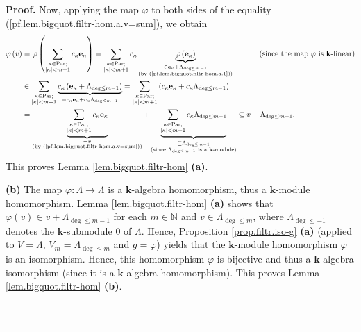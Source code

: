 \documentclass[numbers=enddot,12pt,final,onecolumn,notitlepage]{scrartcl}%
\theoremstyle{definition}
\newenvironment{proof}[1][Proof]{\noindent\textbf{#1.} }{\ \rule{0.5em}{0.5em}}
\let\sumnonlimits\sum
\renewcommand{\sum}{\sumnonlimits\limits}
\begin{document}
\begin{proof}
Now, applying the map $\varphi$ to both sides of the equality
(\ref{pf.lem.bigquot.filtr-hom.a.v=sum}), we obtain%
\begin{align*}
\varphi\left(  v\right)   &  =\varphi\left(  \sum_{\substack{\kappa
\in\operatorname*{Par};\\\left\vert \kappa\right\vert <m+1}}c_{\kappa
}\mathbf{e}_{\kappa}\right)  =\sum_{\substack{\kappa\in\operatorname*{Par}%
;\\\left\vert \kappa\right\vert <m+1}}c_{\kappa}\underbrace{\varphi\left(
\mathbf{e}_{\kappa}\right)  }_{\substack{\in\mathbf{e}_{\kappa}+\Lambda
_{\deg\leq m-1}\\\text{(by (\ref{pf.lem.bigquot.filtr-hom.a.1}))}%
}}\ \ \ \ \ \ \ \ \ \ \left(  \text{since the map }\varphi\text{ is
}\mathbf{k}\text{-linear}\right) \\
&  \in\sum_{\substack{\kappa\in\operatorname*{Par};\\\left\vert \kappa
\right\vert <m+1}}\underbrace{c_{\kappa}\left(  \mathbf{e}_{\kappa}%
+\Lambda_{\deg\leq m-1}\right)  }_{=c_{\kappa}\mathbf{e}_{\kappa}+c_{\kappa
}\Lambda_{\deg\leq m-1}}=\sum_{\substack{\kappa\in\operatorname*{Par}%
;\\\left\vert \kappa\right\vert <m+1}}\left(  c_{\kappa}\mathbf{e}_{\kappa
}+c_{\kappa}\Lambda_{\deg\leq m-1}\right) \\
&  =\underbrace{\sum_{\substack{\kappa\in\operatorname*{Par};\\\left\vert
\kappa\right\vert <m+1}}c_{\kappa}\mathbf{e}_{\kappa}}%
_{\substack{=v\\\text{(by (\ref{pf.lem.bigquot.filtr-hom.a.v=sum}))}%
}}+\underbrace{\sum_{\substack{\kappa\in\operatorname*{Par};\\\left\vert
\kappa\right\vert <m+1}}c_{\kappa}\Lambda_{\deg\leq m-1}}_{\substack{\subseteq
\Lambda_{\deg\leq m-1}\\\text{(since }\Lambda_{\deg\leq m-1}\text{ is a
}\mathbf{k}\text{-module)}}}\subseteq v+\Lambda_{\deg\leq m-1}.
\end{align*}
This proves Lemma \ref{lem.bigquot.filtr-hom} \textbf{(a)}.

\textbf{(b)} The map $\varphi:\Lambda\rightarrow\Lambda$ is a $\mathbf{k}%
$-algebra homomorphism, thus a $\mathbf{k}$-module homomorphism. Lemma
\ref{lem.bigquot.filtr-hom} \textbf{(a)} shows that $\varphi\left(  v\right)
\in v+\Lambda_{\deg\leq m-1}$ for each $m\in\mathbb{N}$ and $v\in\Lambda
_{\deg\leq m}$, where $\Lambda_{\deg\leq-1}$ denotes the $\mathbf{k}%
$-submodule $0$ of $\Lambda$. Hence, Proposition \ref{prop.filtr.iso-g}
\textbf{(a)} (applied to $V=\Lambda$, $V_{m}=\Lambda_{\deg\leq m}$ and
$g=\varphi$) yields that the $\mathbf{k}$-module homomorphism $\varphi$ is an
isomorphism. Hence, this homomorphism $\varphi$ is bijective and thus a
$\mathbf{k}$-algebra isomorphism (since it is a $\mathbf{k}$-algebra
homomorphism). This proves Lemma \ref{lem.bigquot.filtr-hom} \textbf{(b)}.


\end{proof}
\end{document}
